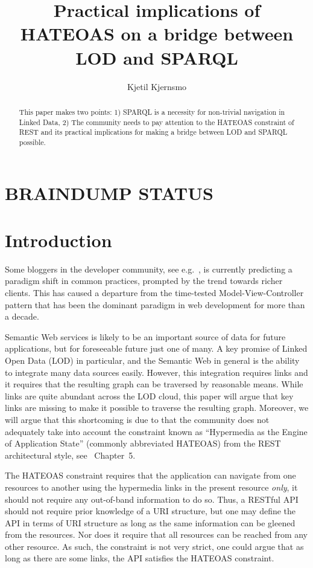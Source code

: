 \documentclass{llncs}
\title{Practical implications of HATEOAS on a bridge between LOD and SPARQL}
\author{Kjetil Kjernsmo\inst{1}}
\institute{Department of Informatics,
Postboks 1080 Blindern,
0316 Oslo, Norway
\email{kjekje@ifi.uio.no}}
\begin{document}
\maketitle



\begin{abstract}
This paper makes two points: 1) SPARQL is a necessity %
for non-trivial navigation in Linked Data, 
2) The community needs to pay attention to
the HATEOAS constraint of REST and its practical implications for
making a bridge between LOD and SPARQL possible.


\end{abstract}

\section*{BRAINDUMP STATUS}

\section{Introduction}

Some bloggers in the developer community, see e.g.~\cite{sunsetonmvc},
is currently predicting a paradigm shift in common practices, prompted
by the trend towards richer clients. This has caused a departure from
the time-tested Model-View-Controller pattern that has been the
dominant paradigm in web development for more than a decade.

Semantic Web services is likely to be an important source of data for
future applications, but for foreseeable future just one of many. A
key promise of Linked Open Data (LOD) in particular, and the Semantic
Web in general is the ability to integrate many data sources
easily. However, this integration requires links and it requires that
the resulting graph can be traversed by reasonable means. While links
are quite abundant across the LOD cloud, this paper will argue that
key links are missing to make it possible to traverse the resulting
graph. Moreover, we will argue that this shortcoming is due to that
the community does not adequately take into account the constraint
known as ``Hypermedia as the Engine of Application State'' (commonly
abbreviated HATEOAS) from the REST architectural style, see
\cite{Fielding_2000_Architectural-Styles}~Chapter~5.

The HATEOAS constraint requires that the application can navigate from
one resources to another using the hypermedia links in the present
resource \emph{only}, it should not require any out-of-band
information to do so. Thus, a RESTful API should not require prior
knowledge of a URI structure, but one may define the API in terms of
URI structure as long as the same information can be gleened from the
resources. Nor does it require that all resources can be reached from
any other resource. As such, the constraint is not very strict, one
could argue that as long as there are some links, the API satisfies
the HATEOAS constraint.
\end{document}
